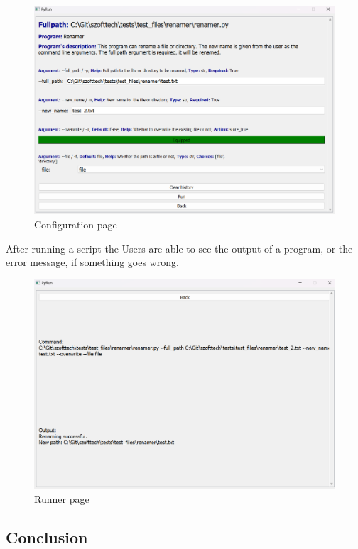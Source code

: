 \documentclass{article}
\begin{document}
\begin{figure}[h]
    \centering
    \includegraphics[width=1\linewidth]{img/config_page.png}
    \caption{Configuration page}
    \label{fig:enter-label}
\end{figure}

\clearpage

After running a script the Users are able to see the output of a program, or the error message, if something goes wrong.

\begin{figure}[h]
    \centering
    \includegraphics[width=1\linewidth]{img/runner_page.png}
    \caption{Runner page}
    \label{fig:enter-label}
\end{figure}

\subsection{Conclusion}
\end{document}
